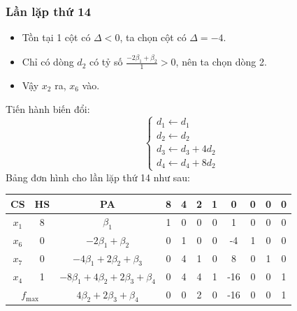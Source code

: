 \documentclass[12pt]{article}
\begin{document}
\subsubsection{Lần lặp thứ 14}
\begin{itemize}
\item Tồn tại 1 cột có $\Delta < 0$, ta chọn cột có $\Delta = -4$.
\item Chỉ có dòng $d_2$ có tỷ số $\displaystyle \frac{-2\beta_1 + \beta_2}{1} > 0$, nên ta chọn dòng 2.
\item Vậy $x_2$ ra, $x_6$ vào.
\end{itemize}
Tiến hành biến đổi:
$$
\left\{
\begin{array}{lll}
d_1 \leftarrow d_1 \\
d_2 \leftarrow d_2\\
d_3 \leftarrow d_3 + 4d_2\\
d_4 \leftarrow d_4 + 8d_2
\end{array}
\right.
$$
Bảng đơn hình cho lần lặp thứ 14 như sau:
\begin{table}[H]
\centering
\begin{tabular}{|c|c|c|c|c|c|c|c|c|c|c|}
\hline
CS & HS & PA & 8 & 4 & 2 & 1 & 0 & 0 & 0 & 0 \\
\hline
$x_1$ & 8 & $\beta_1$ & 1 & 0 & 0 & 0 & 1 & 0 & 0 & 0 \\
$x_6$ & 0 & $-2\beta_1 + \beta_2$ & 0 & 1 & 0 & 0 & -4 & 1 & 0 & 0 \\
$x_7$ & 0 & $-4\beta_1 + 2\beta_2 + \beta_3$ & 0 & 4 & 1 & 0 & 8 & 0 & 1 & 0 \\
$x_4$ & 1 & $-8\beta_1 + 4\beta_2 + 2\beta_3 + \beta_4$ & 0 & 4 & 4 & 1 & -16 & 0 & 0 & 1 \\
\hline
\multicolumn{2}{|c|}{$f_{\max}$}
& $4\beta_2 + 2\beta_3 + \beta_4$ & 0 & 0 & 2 & 0 & -16 & 0 & 0 & 1 \\
\hline
\end{tabular}
\end{table}
\end{document}
